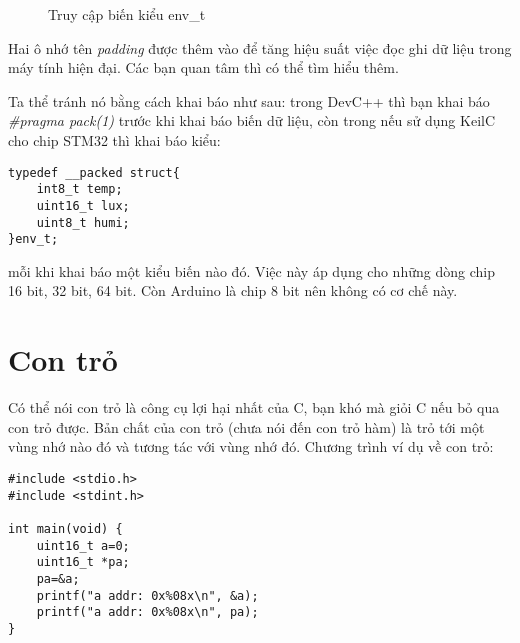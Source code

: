 \begin{figure}[h!]
\centering
{}
\caption{Truy cập biến kiểu env\_t} 
\end{figure}

Hai ô nhớ tên \textit{padding} được thêm vào để tăng hiệu suất việc đọc ghi dữ liệu trong máy tính hiện đại. Các bạn quan tâm thì có thể tìm hiểu thêm. 

Ta thể tránh nó bằng cách khai báo như sau: trong DevC++ thì bạn khai báo \textit{\#pragma pack(1)} trước khi khai báo biến dữ liệu, còn trong nếu sử dụng KeilC cho chip STM32 thì khai báo kiểu:

\begin{lstlisting}
typedef __packed struct{
    int8_t temp;
    uint16_t lux;
    uint8_t humi;
}env_t;
\end{lstlisting}

mỗi khi khai báo một kiểu biến nào đó. Việc này áp dụng cho những dòng chip 16 bit, 32 bit, 64 bit. Còn Arduino là chip 8 bit nên không có cơ chế này.

\section{Con trỏ}

Có thể nói con trỏ là công cụ lợi hại nhất của C, bạn khó mà giỏi C nếu bỏ qua con trỏ được. Bản chất của con trỏ (chưa nói đến con trỏ hàm) là trỏ tới một vùng nhớ nào đó và tương tác với vùng nhớ đó. Chương trình ví dụ về con trỏ:

\begin{lstlisting}
#include <stdio.h>
#include <stdint.h>

int main(void) {
    uint16_t a=0;
    uint16_t *pa;
    pa=&a;
    printf("a addr: 0x%08x\n", &a);
    printf("a addr: 0x%08x\n", pa);
}
\end{lstlisting}

